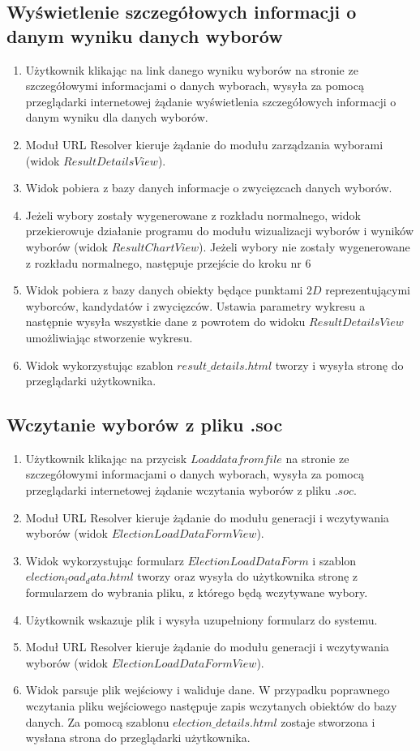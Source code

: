 \documentclass[pdflatex,11pt]{../aghdoc_version2}
\begin{document}
\subsection{Wyświetlenie szczegółowych informacji o danym wyniku danych
wyborów}
\begin{enumerate}
\item Użytkownik klikając na link danego wyniku wyborów na stronie ze szczegółowymi
informacjami o danych wyborach, wysyła za pomocą przeglądarki internetowej
żądanie wyświetlenia szczegółowych informacji o danym wyniku dla danych
wyborów.
\item Moduł URL Resolver kieruje żądanie do modułu zarządzania wyborami (widok
$ResultDetailsView$).
\item Widok pobiera z bazy danych informacje o zwycięzcach danych wyborów.
\item Jeżeli wybory zostały wygenerowane z rozkładu normalnego, widok przekierowuje
działanie programu do modułu wizualizacji wyborów i wyników wyborów (widok
$ResultChartView$). Jeżeli wybory nie zostały wygenerowane z rozkładu normalnego, następuje przejście do kroku nr $6$
\item Widok pobiera z bazy danych obiekty będące punktami $2D$ reprezentującymi
wyborców, kandydatów i zwycięzców. Ustawia parametry wykresu a następnie
wysyła wszystkie dane z powrotem do widoku $ResultDetailsView$ umożliwiając
stworzenie wykresu.
\item Widok wykorzystując szablon $result\_details.html$ tworzy i wysyła stronę do
przeglądarki użytkownika.
\end{enumerate}

\subsection{Wczytanie wyborów z pliku .soc}
\begin{enumerate}
\item Użytkownik klikając na przycisk $Load data from file$ na stronie ze szczegółowymi
informacjami o danych wyborach, wysyła za pomocą przeglądarki internetowej
żądanie wczytania wyborów z pliku $.soc$.
\item Moduł URL Resolver kieruje żądanie do modułu generacji i wczytywania wyborów (widok
$ElectionLoadDataFormView$).
\item Widok wykorzystując formularz $ElectionLoadDataForm$ i szablon
$election_load_data.html$ tworzy oraz wysyła do użytkownika stronę z formularzem do
wybrania pliku, z którego będą wczytywane wybory.
\item Użytkownik wskazuje plik i wysyła uzupełniony formularz do systemu.
\item Moduł URL Resolver kieruje żądanie do modułu generacji i wczytywania wyborów (widok
$ElectionLoadDataFormView$).
\item Widok parsuje plik wejściowy i waliduje dane. W przypadku poprawnego wczytania
pliku wejściowego następuje zapis wczytanych obiektów do bazy danych. Za pomocą
szablonu $election\_details.html$ zostaje stworzona i wysłana strona do przeglądarki
użytkownika.
\end{enumerate}
\end{document}
